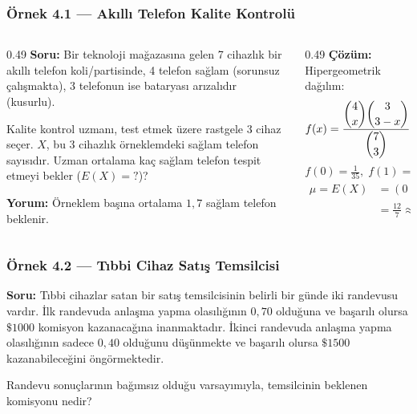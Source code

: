 ﻿\documentclass[light]{lutbeamer}
\begin{document}
\begin{frame}[fragile]
  \frametitle[Örnek 4.1]{Örnek 4.1 --- Akıllı Telefon Kalite Kontrolü}

  \smallskip
  \begin{columns}[T,onlytextwidth]
    \begin{column}{0.49\textwidth}
      \footnotesize
      \textbf{Soru:} Bir teknoloji mağazasına gelen 7 cihazlık bir akıllı telefon
      koli/partisinde, 4 telefon sağlam (sorunsuz çalışmakta), 3 telefonun ise
      bataryası arızalıdır (kusurlu).

      \smallskip
      Kalite kontrol uzmanı, test etmek üzere rastgele 3 cihaz seçer.
      $X$, bu 3 cihazlık örneklemdeki sağlam telefon sayısıdır.
      Uzman ortalama kaç sağlam telefon tespit etmeyi bekler ($E(X)=?$)?


      \vspace{5em}
      \textbf{Yorum:} Örneklem başına ortalama
      $1{,}7$ sağlam telefon beklenir.
    \end{column}



    \begin{column}{0.49\textwidth}
      \footnotesize
      \vspace{-2.6em}
      \textbf{Çözüm:} Hipergeometrik dağılım:
      \[
      f(x)=\dfrac{\dbinom{4}{x}\dbinom{3}{3-x}}{\dbinom{7}{3}},
      \quad x=0,1,2,3
      \]
      \[
      f(0)=\tfrac{1}{35},\;
      f(1)=\tfrac{12}{35},\;
      f(2)=\tfrac{18}{35},\;
      f(3)=\tfrac{4}{35}
      \]
      \begin{align*}
        \mu=E(X)
        &= (0)\!\left(\tfrac{1}{35}\right)
         + (1)\!\left(\tfrac{12}{35}\right)
         + (2)\!\left(\tfrac{18}{35}\right)
         + (3)\!\left(\tfrac{4}{35}\right)\\
        &= \frac{12}{7}\approx 1{,}7
      \end{align*}
    \end{column}
  \end{columns}
\end{frame}

\begin{frame}[fragile]
  \frametitle[Örnek 4.2]{Örnek 4.2 --- Tıbbi Cihaz Satış Temsilcisi}

  \smallskip
  \textbf{Soru:} Tıbbi cihazlar satan bir satış temsilcisinin belirli bir günde iki randevusu vardır.
  İlk randevuda anlaşma yapma olasılığının $0{,}70$ olduğuna ve başarılı olursa $\$1000$ komisyon kazanacağına inanmaktadır. İkinci randevuda anlaşma yapma olasılığının sadece $0{,}40$ olduğunu düşünmekte ve başarılı olursa $\$1500$ kazanabileceğini öngörmektedir. 
  
  \medskip
  Randevu sonuçlarının bağımsız olduğu varsayımıyla, temsilcinin beklenen komisyonu nedir?
\end{frame}
\end{document}
